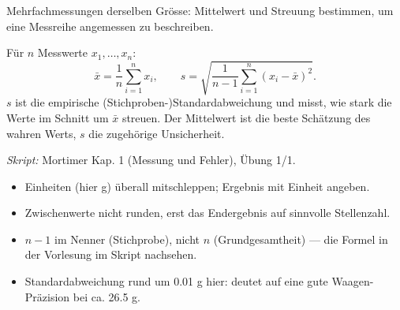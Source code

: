 

Mehrfachmessungen derselben Grösse: Mittelwert und Streuung bestimmen, um eine
Messreihe angemessen zu beschreiben.

\begin{werkzeugkasten}
Für $n$ Messwerte $x_1,\dots,x_n$:
\begin{equation}
  \bar x = \frac{1}{n}\sum_{i=1}^{n}x_i,\qquad
  s = \sqrt{\frac{1}{n-1}\sum_{i=1}^{n}(x_i-\bar x)^2}.
\end{equation}
$s$ ist die empirische (Stichproben-)Standardabweichung und misst, wie stark
die Werte im Schnitt um $\bar x$ streuen. Der Mittelwert ist die beste
Schätzung des wahren Werts, $s$ die zugehörige Unsicherheit.

\textit{Skript:} Mortimer Kap. 1 (Messung und Fehler), Übung 1/1.
\end{werkzeugkasten}

\begin{achtung}
\begin{itemize}
  \item Einheiten (hier g) überall mitschleppen; Ergebnis mit Einheit angeben.
  \item Zwischenwerte nicht runden, erst das Endergebnis auf sinnvolle
        Stellenzahl.
  \item $n-1$ im Nenner (Stichprobe), nicht $n$ (Grundgesamtheit) --- die
        Formel in der Vorlesung im Skript nachsehen.
  \item Standardabweichung rund um 0.01 g hier: deutet auf eine gute
        Waagen-Präzision bei ca. 26.5 g.
\end{itemize}
\end{achtung}
